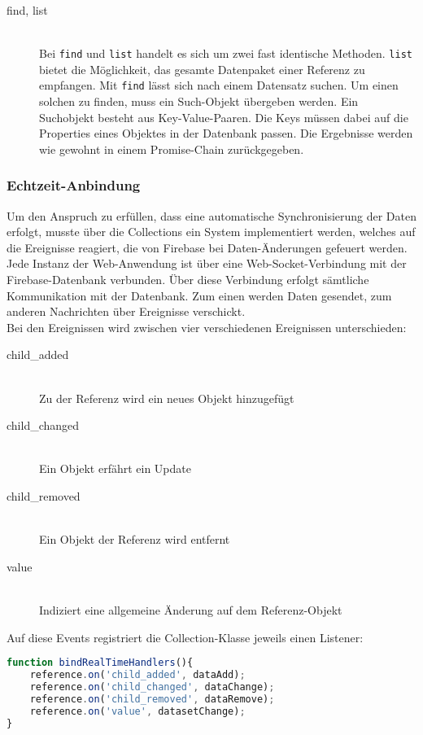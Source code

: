 \begin{description}
\item[find, list]\hfill \\
Bei \texttt{find} und \texttt{list} handelt es sich um zwei fast identische Methoden. \texttt{list} bietet die Möglichkeit, das gesamte Datenpaket einer Referenz zu empfangen.
Mit \texttt{find} lässt sich nach einem Datensatz suchen. Um einen solchen zu finden, muss ein Such-Objekt übergeben werden.
Ein Suchobjekt besteht aus Key-Value-Paaren. Die Keys müssen dabei auf die Properties eines Objektes in der Datenbank passen.
Die Ergebnisse werden wie gewohnt in einem Promise-Chain zurückgegeben.


\end{description}

\subsubsection{Echtzeit-Anbindung}
Um den Anspruch zu erfüllen, dass eine automatische Synchronisierung der Daten erfolgt, musste über die Collections ein System implementiert werden, welches
auf die Ereignisse reagiert, die von Firebase bei Daten-Änderungen gefeuert werden.\\
Jede Instanz der Web-Anwendung ist über eine Web-Socket-Verbindung mit der Firebase-Datenbank verbunden.
Über diese Verbindung erfolgt sämtliche Kommunikation mit der Datenbank. Zum einen werden Daten gesendet, zum anderen Nachrichten über Ereignisse verschickt.\\
Bei den Ereignissen wird zwischen vier verschiedenen Ereignissen unterschieden:

\begin{description}
\item[child\_added]\hfill \\
Zu der Referenz wird ein neues Objekt hinzugefügt
\item[child\_changed]\hfill \\
Ein Objekt erfährt ein Update
\item[child\_removed]\hfill \\
Ein Objekt der Referenz wird entfernt
\item[value]\hfill \\
Indiziert eine allgemeine Änderung auf dem Referenz-Objekt
\end{description}

Auf diese Events registriert die Collection-Klasse jeweils einen Listener:

 \begin{lstlisting}[language=Javascript, label=code_CollectionListenerBnding, caption=Registrierung der Event-Handler von Datenbank-Events]
function bindRealTimeHandlers(){
    reference.on('child_added', dataAdd);
    reference.on('child_changed', dataChange);
    reference.on('child_removed', dataRemove);
    reference.on('value', datasetChange);
}
\end{lstlisting}

